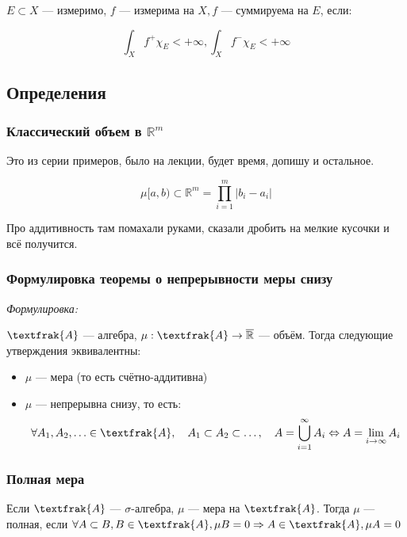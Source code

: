 \documentclass{article}
\begin{document}
$E \subset X$ --- измеримо, $f$ --- измерима на $X, f$ --- суммируема на $E$, если:

\[\int_{X} f^{+} \chi_{E} < + \infty, \int_{X} f^{-} \chi_{E} < + \infty\]


\newpage

\subsection{Определения}

\subsubsection{Классический объем в $\mathbb R^m$}

Это из серии примеров, было на лекции, будет время, допишу и остальное.

\[\mu [a, b) \subset \mathbb{R}^m = \prod_{i = 1}^{m} |b_i - a_i|\]

Про аддитивность там помахали руками, сказали дробить на мелкие кусочки и всё получится.

\subsubsection{Формулировка теоремы о непрерывности меры снизу}

\textit{Формулировка:}

$\textfrak{A}$ --- алгебра, $\mu: \textfrak{A} \rightarrow \overline{\mathbb{R}}$ --- объём. Тогда следующие утверждения эквивалентны: 

\begin{itemize}
    \item $\mu$ --- мера (то есть счётно-аддитивна)
    \item $\mu$ --- непрерывна снизу, то есть: 
    \[\forall A_1, A_2, \ldots \in \textfrak{A}, \quad A_1 \subset A_2 \subset \ldots, \quad A = \bigcup_{i = 1}^{\infty} A_i \Leftrightarrow A = \lim_{i \rightarrow \infty} A_i\]
\end{itemize}

\subsubsection{Полная мера}

Если $\textfrak{A}$ --- $\sigma$-алгебра, $\mu$ --- мера на $\textfrak{A}$. Тогда $\mu$ --- полная, если $\forall A \subset B, B \in \textfrak{A}, \mu B = 0 \Rightarrow A \in \textfrak{A}, \mu A = 0$
\end{document}
